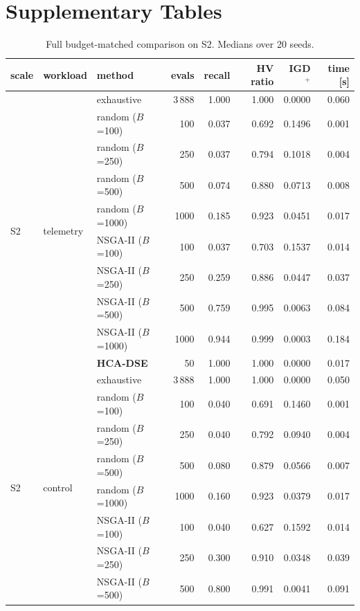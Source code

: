 \documentclass[pdflatex,sn-nature]{sn-jnl}
\theoremstyle{thmstyleone}
\theoremstyle{thmstyletwo}
\theoremstyle{thmstylethree}
\begin{document}
\section{Supplementary Tables}\label{stables}

\begin{table}[!htbp]\centering
\caption{Full budget-matched comparison on S2. Medians over 20 seeds.}\label{tabS1}
{\let\scriptsize\tiny\setlength{\tabcolsep}{2pt}\scriptsize
\begin{tabular}{lllrrrrr}
\toprule
scale & workload & method & evals & recall & HV ratio & IGD$^{+}$ & time [s] \\
\midrule
\multirow{10}{*}{S2} & \multirow{10}{*}{telemetry} & exhaustive & 3\,888 & 1.000 & 1.000 & 0.0000 & 0.060 \\
 & & random ($B$=100) & 100 & 0.037 & 0.692 & 0.1496 & 0.001 \\
 & & random ($B$=250) & 250 & 0.037 & 0.794 & 0.1018 & 0.004 \\
 & & random ($B$=500) & 500 & 0.074 & 0.880 & 0.0713 & 0.008 \\
 & & random ($B$=1000) & 1000 & 0.185 & 0.923 & 0.0451 & 0.017 \\
 & & NSGA-II ($B$=100) & 100 & 0.037 & 0.703 & 0.1537 & 0.014 \\
 & & NSGA-II ($B$=250) & 250 & 0.259 & 0.886 & 0.0447 & 0.037 \\
 & & NSGA-II ($B$=500) & 500 & 0.759 & 0.995 & 0.0063 & 0.084 \\
 & & NSGA-II ($B$=1000) & 1000 & 0.944 & 0.999 & 0.0003 & 0.184 \\
 & & \textbf{HCA-DSE} & 50 & 1.000 & 1.000 & 0.0000 & 0.017 \\
\midrule
\multirow{10}{*}{S2} & \multirow{10}{*}{control} & exhaustive & 3\,888 & 1.000 & 1.000 & 0.0000 & 0.050 \\
 & & random ($B$=100) & 100 & 0.040 & 0.691 & 0.1460 & 0.001 \\
 & & random ($B$=250) & 250 & 0.040 & 0.792 & 0.0940 & 0.004 \\
 & & random ($B$=500) & 500 & 0.080 & 0.879 & 0.0566 & 0.007 \\
 & & random ($B$=1000) & 1000 & 0.160 & 0.923 & 0.0379 & 0.017 \\
 & & NSGA-II ($B$=100) & 100 & 0.040 & 0.627 & 0.1592 & 0.014 \\
 & & NSGA-II ($B$=250) & 250 & 0.300 & 0.910 & 0.0348 & 0.039 \\
 & & NSGA-II ($B$=500) & 500 & 0.800 & 0.991 & 0.0041 & 0.091 \\

\end{tabular}}
\end{table}
\end{document}
